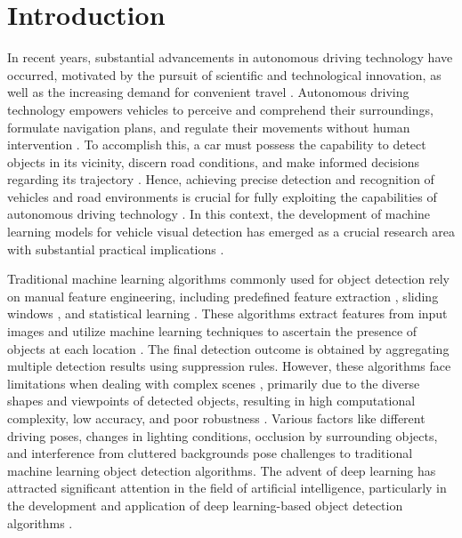 \documentclass[aic]{iosart2x}
\begin{document}
\section{Introduction} \label{sec:introduction}

In recent years, substantial advancements in autonomous driving technology have occurred, motivated by the pursuit of scientific and technological innovation, as well as the increasing demand for convenient travel \cite{Grigorescu_2020, Kiran_2022}. Autonomous driving technology empowers vehicles to perceive and comprehend their surroundings, formulate navigation plans, and regulate their movements without human intervention \cite{Yurtsever_2020}. To accomplish this, a car must possess the capability to detect objects in its vicinity, discern road conditions, and make informed decisions regarding its trajectory \cite{Petit_2014}. Hence, achieving precise detection and recognition of vehicles and road environments is crucial for fully exploiting the capabilities of autonomous driving technology \cite{Gupta_2021}. In this context, the development of machine learning models for vehicle visual detection has emerged as a crucial research area with substantial practical implications \cite{Liu_2021}.

Traditional machine learning algorithms commonly used for object detection rely on manual feature engineering, including predefined feature extraction \cite{Outay_2020, Wang_2019, Shi_2019}, sliding windows \cite{Xueyun_Chen_2014, Chen_2019, Song_2019}, and statistical learning \cite{Cucchiara, Zehang_Sun_2006, Wang_2008, Alotibi_2021}. These algorithms extract features from input images and utilize machine learning techniques to ascertain the presence of objects at each location \cite{Liu_2019}. The final detection outcome is obtained by aggregating multiple detection results using suppression rules. However, these algorithms face limitations when dealing with complex scenes \cite{Wang_2023}, primarily due to the diverse shapes and viewpoints of detected objects, resulting in high computational complexity, low accuracy, and poor robustness \cite{Srivastava_2021}. Various factors like different driving poses, changes in lighting conditions, occlusion by surrounding objects, and interference from cluttered backgrounds pose challenges to traditional machine learning object detection algorithms. The advent of deep learning has attracted significant attention in the field of artificial intelligence, particularly in the development and application of deep learning-based object detection algorithms \cite{Srivastava_2021}.
\end{document}
